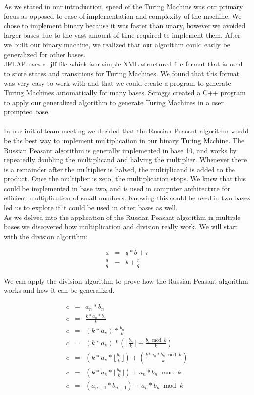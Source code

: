 \documentclass{article}
\begin{document}
\\[10pt] As we stated in our introduction, speed of the Turing Machine was our primary focus as opposed to ease of implementation and complexity of the machine. We chose to implement binary because it was faster than unary, however we avoided larger bases due to the vast amount of time required to implement them. After we built our binary machine, we realized that our algorithm could easily be generalized for other bases.  
\\[5pt]
JFLAP uses a .jff file which is a simple XML structured file format that is used to store states and transitions for Turing Machines. We found that this format was very easy to work with and that we could create a program to generate Turing Machines automatically for many bases. Scroggs created a C++ program to apply our generalized algorithm to generate Turing Machines in a user prompted base. 	
\\[10pt]
\\[10pt]
In our initial team meeting we decided that the Russian Peasant algorithm would be the best way to implement multiplication in our binary Turing Machine. The Russian Peasant algorithm is generally implemented in base 10, and works by repeatedly doubling the multiplicand and halving the multiplier. Whenever there is a remainder after the multiplier is halved, the multiplicand is added to the product. Once the multiplier is zero, the multiplication stops. We knew that this could be implemented in base two, and is used in computer architecture for efficient multiplication of small numbers. Knowing this could be used in two bases led us to explore if it could be used in other bases as well.
\\[5pt]
As we delved into the application of the Russian Peasant algorithm in multiple bases we discovered how multiplication and division really work. We will start with the division algorithm:

\begin{eqnarray}
a  &=& q*b + r \nonumber\\
\frac{a}{q} &=& b + \frac{r}{q}\nonumber
\end{eqnarray}

\noindent We can apply the division algorithm to prove how the Russian Peasant algorithm works and how it can be generalized.

\begin{eqnarray}
c  &=& a_n * b_n \nonumber\\
c &=& \frac{k*a_n*b_n}{k} \nonumber\\
c &=& (k*a_n) * \frac{b_n}{k} \nonumber\\
c &=& (k*a_n) * (\lfloor \frac{b_n}{k} \rfloor + \frac{b_n\bmod k}{k})\nonumber\\
c &=& (k*a_n * \lfloor \frac{b_1}{k} \rfloor) + (\frac{k*a_n*b_n \bmod k}{k})\nonumber\\
c &=& (k*a_n * \lfloor \frac{b_n}{k} \rfloor) + a_n*b_n \bmod k\nonumber\\
c &=& (a_{n+1} * b_{n+1}) + a_n*b_n \bmod k\nonumber
\end{eqnarray}
\end{document}
